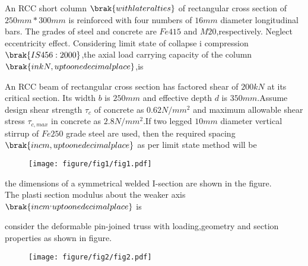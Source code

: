 

\iffalse
    \title{Assignment}
    \author{EE24BTECH11028}
    \section{CE}
    \chapter{2018}
  \fi
    \item An RCC short column $\brak{with lateral ties}$ of rectangular cross section of $250 mm * 300 mm$ is reinforced with four numbers of $16 mm$ diameter longitudinal bars. The grades of steel and concrete are $Fe415$ and $M20$,respectively. Neglect eccentricity effect. Considering limit state of collapse i  compression $\brak{IS 456 : 2000}$,the axial load carrying capacity of the column $\brak{in kN, up to one decimal place}$,is \\
 \item An  RCC beam of rectangular cross section has factored shear of $200 kN$ at its critical section. Its width $b$ is $250 mm$ and effective depth $d$ is $350 mm$.Assume design shear strength $\tau_{c}$ of concrete as $0.62 N/mm^{2}$ and maximum allowable shear stress $\tau_{c,max}$ in concrete as $2.8 N/mm^{2}$.If two legged $10 mm$ diameter vertical stirrup of $Fe250$ grade steel are used, then the required spacing $\brak{in cm,up to one decimal place}$ as per limit state method will be\\
 \begin{figure}[h!]
         \centering
        \texttt{[image: figure/fig1/fig1.pdf]}
		\caption{}
        \label{stemplot}

\end{figure}
 \item the dimensions of a symmetrical welded I-section are shown in the figure.\\
 
 The plasti section modulus about the weaker axis $\brak{in cm^,up to one decimal place}$ is\\
 \item consider the deformable pin-joined truss with loading,geometry and section properties as shown in figure.\\

 \begin{figure}[h!]
         \centering
        \texttt{[image: figure/fig2/fig2.pdf]}
		\caption{}
        \label{stemplot}

\end{figure}

